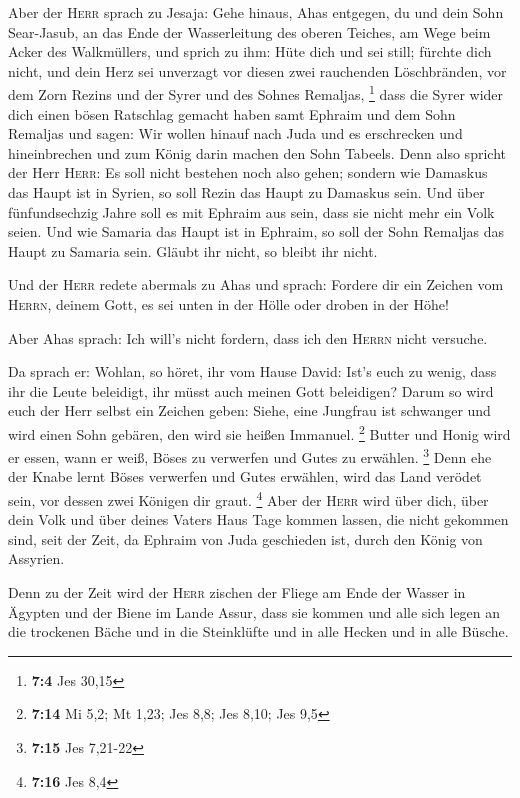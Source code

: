  Aber der \textsc{Herr} sprach zu Jesaja: Gehe hinaus,
Ahas entgegen, du und dein Sohn Sear-Jasub, an das Ende der
Wasserleitung des oberen Teiches, am Wege beim Acker des Walkmüllers,
 und sprich zu ihm: Hüte dich und sei still; fürchte dich
nicht, und dein Herz sei unverzagt vor diesen zwei rauchenden
Löschbränden, vor dem Zorn Rezins und der Syrer und des Sohnes Remaljas,
\footnote{\textbf{7:4} Jes 30,15}  dass die Syrer wider
dich einen bösen Ratschlag gemacht haben samt Ephraim und dem Sohn
Remaljas und sagen:  Wir wollen hinauf nach Juda und es
erschrecken und hineinbrechen und zum König darin machen den Sohn
Tabeels.  Denn also spricht der Herr \textsc{Herr}: Es
soll nicht bestehen noch also gehen;  sondern wie Damaskus
das Haupt ist in Syrien, so soll Rezin das Haupt zu Damaskus sein. Und
über fünfundsechzig Jahre soll es mit Ephraim aus sein, dass sie nicht
mehr ein Volk seien.  Und wie Samaria das Haupt ist in
Ephraim, so soll der Sohn Remaljas das Haupt zu Samaria sein. Gläubt ihr
nicht, so bleibt ihr nicht.

 Und der \textsc{Herr} redete abermals zu Ahas und
sprach:  Fordere dir ein Zeichen vom \textsc{Herrn},
deinem Gott, es sei unten in der Hölle oder droben in der Höhe!

 Aber Ahas sprach: Ich will's nicht fordern, dass ich den
\textsc{Herrn} nicht versuche.

 Da sprach er: Wohlan, so höret, ihr vom Hause David:
Ist's euch zu wenig, dass ihr die Leute beleidigt, ihr müsst auch meinen
Gott beleidigen?  Darum so wird euch der Herr selbst ein
Zeichen geben: Siehe, eine Jungfrau ist schwanger und wird einen Sohn
gebären, den wird sie heißen Immanuel. \footnote{\textbf{7:14} Mi 5,2;
  Mt 1,23; Jes 8,8; Jes 8,10; Jes 9,5}  Butter und Honig
wird er essen, wann er weiß, Böses zu verwerfen und Gutes zu erwählen.
\footnote{\textbf{7:15} Jes 7,21-22}  Denn ehe der Knabe
lernt Böses verwerfen und Gutes erwählen, wird das Land verödet sein,
vor dessen zwei Königen dir graut. \footnote{\textbf{7:16} Jes 8,4}
 Aber der \textsc{Herr} wird über dich, über dein Volk
und über deines Vaters Haus Tage kommen lassen, die nicht gekommen sind,
seit der Zeit, da Ephraim von Juda geschieden ist, durch den König von
Assyrien.

 Denn zu der Zeit wird der \textsc{Herr} zischen der
Fliege am Ende der Wasser in Ägypten und der Biene im Lande Assur,
 dass sie kommen und alle sich legen an die trockenen
Bäche und in die Steinklüfte und in alle Hecken und in alle Büsche.

